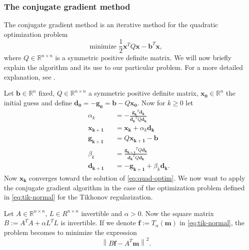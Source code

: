 \documentclass[12pt,a4]{article}
\newcommand{\R}{{\mathbb R}}
\newcommand{\lnorm}{\left\|}
\newcommand{\rnorm}{\right\|}
\newcommand{\vc}[1]{\ensuremath{\bm{#1}}}
\begin{document}
\subsubsection{The conjugate gradient method}
\label{sec:conjgrad}

The conjugate gradient method is an iterative method for the quadratic optimization problem
\begin{equation}
\label{eq:quad-optim}
\text{minimize } \frac{1}{2} \vc{x}^T Q \vc{x} - \vc{b}^T \vc{x} ,
\end{equation}
where $Q \in \R^{n \times n}$ is a symmetric positive definite matrix. We will now briefly explain the algorithm and its use to our particular problem. For a more detailed explanation, see \cite{samu}.

Let $\vc{b} \in \R^n$ fixed, $Q \in \R^{n \times n}$ a symmetric positive definite matrix, $\vc{x_0} \in \R^n$ the initial guess and define $\vc{d_0} = -\vc{g_0} = \vc{b} - Q \vc{x_0}$. Now for $k \geq 0$ let
\begin{equation}
\begin{alignedat}{3}
&\alpha_k      &&= -\frac{\vc{g_k}^T \vc{d_k}}{\vc{d_k}^T Q \vc{d_k}} \\
&\vc{x_{k+1}}  &&= \vc{x_k} + \alpha_k \vc{d_k} \\
&\vc{g_{k+1}}  &&= Q \vc{x_{k+1}} - \vc{b} \\
&\beta_k       &&= \frac{\vc{g_{k+1}}^T Q \vc{d_k}}{\vc{d_k}^T Q \vc{d_k}} \\
&\vc{d_{k+1}}  &&= -\vc{g_{k+1}} + \beta_k \vc{d_k} .
\end{alignedat}
\end{equation}
Now $\vc{x_k}$ converges toward the solution of \eqref{eq:quad-optim}. We now want to apply the conjugate gradient algorithm in the case of the optimization problem defined in \eqref{eq:tik-normal} for the Tikhonov regularization.

Let $A \in \R^{n \times n}$, $L \in R^{n \times n}$ invertible and $\alpha > 0$. Now the square matrix $B := A^T A + \alpha L^T L$ is invertible. If we denote $\vc{f} := T_\alpha ( \vc{m} )$ in \eqref{eq:tik-normal}, the problem becomes to minimize the expression
\begin{equation}
\label{eq:conjgrad-basis}
\lnorm B \vc{f} - A^T \vc{m} \rnorm^2 .
\end{equation}
\end{document}
